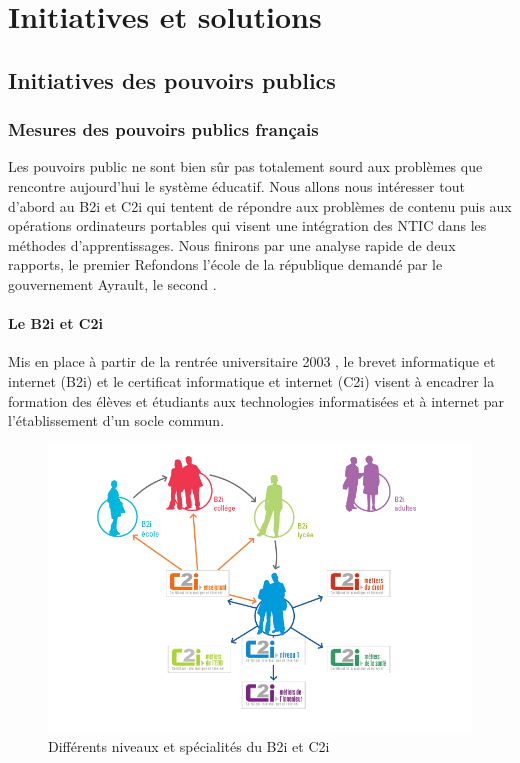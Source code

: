 
\part{Initiatives et solutions}\label{initiatives_actuelles}

\chapter{Initiatives des pouvoirs publics}
\label{chap:initialivespublic}

\section{Mesures des pouvoirs publics français}

Les pouvoirs public ne sont bien sûr pas totalement sourd aux
problèmes que rencontre aujourd'hui le système éducatif. Nous allons
nous intéresser tout d'abord au \og{}B2i et C2i\fg{} qui tentent de répondre aux
problèmes de contenu puis aux opérations \og{}ordinateurs
portables\fg{} qui visent une intégration des NTIC dans les méthodes
d'apprentissages. Nous finirons par une analyse rapide de deux
rapports, le premier \og{}Refondons l'école de la république\fg{}
demandé par le gouvernement Ayrault, le second \og{}\fg{}.

\subsection{Le B2i et C2i}
Mis en place à partir de la rentrée universitaire 2003
\cite{circulaire_c2i}, le brevet informatique et internet (B2i) et le
certificat informatique et internet (C2i) 
visent à encadrer la formation des élèves et étudiants aux technologies
informatisées et à internet par l'établissement d'un socle commun.

\begin{figure}[H]
  \centering
  \includegraphics[width=\textwidth]{../resources/illustrations/c2i}
  \caption{Différents niveaux et spécialités du B2i et C2i}
\end{figure}

